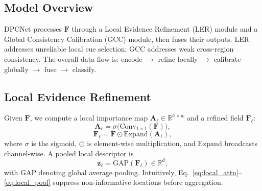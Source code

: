 \documentclass[11pt,a4paper]{article}
\begin{document}
\subsection{Model Overview}
\label{sec:overview}
DPCNet processes $\mathbf{F}$ through a Local Evidence Refinement (LER) module and a Global Consistency Calibration (GCC) module, then fuses their outputs.
LER addresses unreliable local cue selection; GCC addresses weak cross-region consistency.
The overall data flow is: encode $\rightarrow$ refine locally $\rightarrow$ calibrate globally $\rightarrow$ fuse $\rightarrow$ classify.

\subsection{Local Evidence Refinement}
\label{sec:ler}
Given $\mathbf{F}$, we compute a local importance map $\mathbf{A}_{\ell}\in\mathbb{R}^{h\times w}$ and a refined field $\mathbf{F}_{\ell}$:
\begin{equation}
\mathbf{A}_{\ell}=\sigma\big(\mathrm{Conv}_{1\times1}(\mathbf{F})\big),
\label{eq:local_attn}
\end{equation}
\begin{equation}
\mathbf{F}_{\ell}=\mathbf{F}\odot\mathrm{Expand}(\mathbf{A}_{\ell}),
\label{eq:local_refine}
\end{equation}
where $\sigma$ is the sigmoid, $\odot$ is element-wise multiplication, and $\mathrm{Expand}$ broadcasts channel-wise.
A pooled local descriptor is
\begin{equation}
\mathbf{z}_{\ell}=\mathrm{GAP}(\mathbf{F}_{\ell})\in\mathbb{R}^{d},
\label{eq:local_pool}
\end{equation}
with $\mathrm{GAP}$ denoting global average pooling.
Intuitively, Eq.~\eqref{eq:local_attn}--\eqref{eq:local_pool} suppress non-informative locations before aggregation.
\end{document}
